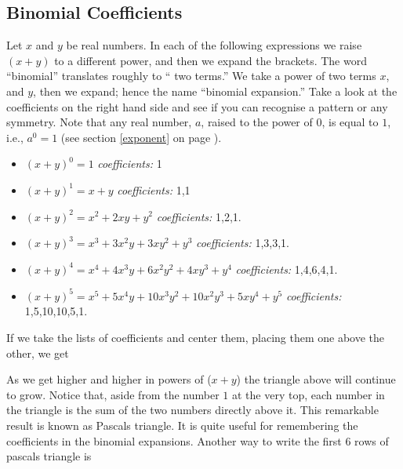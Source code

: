 \subsection{Binomial Coefficients} \label{secbinom}
Let $x$ and $y$ be real numbers. In each of the following expressions we raise $(x+y)$ to a different power, and then we expand the brackets. The word ``binomial'' translates roughly to `` two terms.'' We take a power of two terms $x$, and $y$, then we expand; hence the name ``binomial expansion.'' Take a look at the coefficients on the right hand side and see if you can recognise a pattern or any symmetry. Note that any real number, $a$, raised to the power of $0$, is equal to $1$, i.e., $a^0 = 1$ (see section \ref{exponent} on page \pageref{exponent}). \label{binomial coefficients} \label{pascals triangle}
\begin{itemize}
\item
$(x+y)^0 = 1$ \hfill \textit{coefficients:} 1
\item
$(x+y)^1 = x + y$ \hfill \textit{coefficients:} 1,1
\item
$(x+y)^2 = x^2 + 2xy + y^2$ \hfill \textit{coefficients:} 1,2,1.
\item
$(x + y)^3 =  x^3 + 3x^2y + 3xy^2 + y^3$ \hfill \textit{coefficients:} 1,3,3,1.
\item
$(x + y)^4 = x^4 + 4x^3y + 6x^2y^2 + 4xy^3 + y^4$ \hfill \textit{coefficients:} 1,4,6,4,1.
\item
$(x + y)^5 = x^5 + 5x^4y + 10x^3y^2 + 10x^2y^3 + 5xy^4 + y^5$ \hfill \textit{coefficients:} 1,5,10,10,5,1.
\end{itemize}
If we take the lists of coefficients and center them, placing them one above the other, we get
\begin{center}
\end{center}
As we get higher and higher in powers of ($x+y$) the triangle above will continue to grow. Notice that, aside from the number $1$ at the very top, each number in the triangle is the sum of the two numbers directly above it. This remarkable result is known as Pascals triangle. It is quite useful for remembering the coefficients in the binomial expansions. Another way to write the first 6 rows of pascals triangle is
